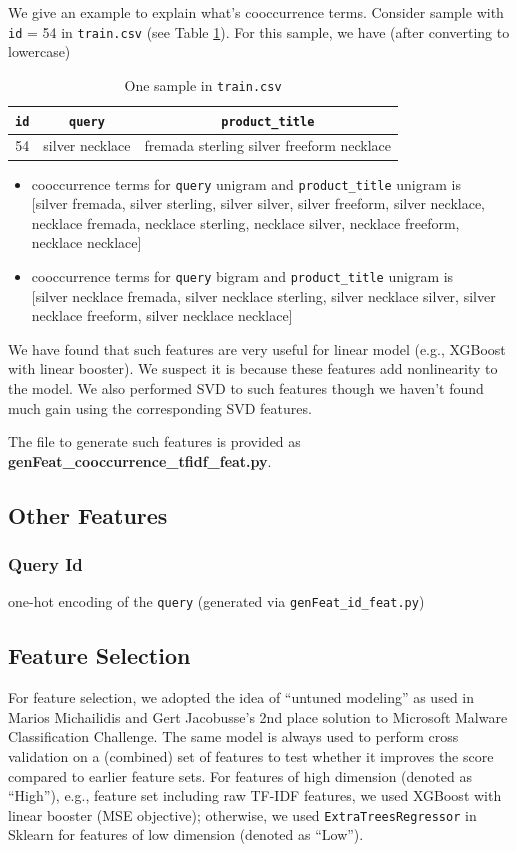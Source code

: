 \documentclass[12pt]{article}
\begin{document}
We give an example to explain what's cooccurrence terms. Consider sample with \texttt{id} = 54 in \texttt{train.csv} (see Table \ref{tab:sample_id54}). For this sample, we have (after converting to lowercase)
\begin{table}[!htb]
\centering
\caption{One sample in \texttt{train.csv}}
\label{tab:sample_id54}
\begin{tabular}{|c|c|c|}
\hline
\texttt{id} & \texttt{query} & \texttt{product\_title} \\
\hline
54 & silver necklace & fremada sterling silver freeform necklace\\
\hline
\end{tabular}
\end{table}
\begin{itemize}
\item cooccurrence terms for \texttt{query} unigram and \texttt{product\_title} unigram is\\
$[$silver fremada, silver sterling, silver silver, silver freeform, silver necklace, necklace fremada, necklace sterling, necklace silver, necklace freeform, necklace necklace$]$
\item cooccurrence terms for \texttt{query} bigram and \texttt{product\_title} unigram is\\
$[$silver necklace fremada, silver necklace sterling, silver necklace silver, silver necklace freeform, silver necklace necklace$]$
\end{itemize}
We have found that such features are very useful for linear model (e.g., XGBoost with linear booster). We suspect it is because these features add nonlinearity to the model. We also performed SVD to such features though we haven't found much gain using the corresponding SVD features.

The file to generate such features is provided as \textbf{genFeat\_cooccurrence\_tfidf\_feat.py}.


\subsection{Other Features}
\subsubsection{Query Id}
one-hot encoding of the \texttt{query} (generated via \texttt{genFeat\_id\_feat.py})

\subsection{Feature Selection}
For feature selection, we adopted the idea of ``untuned modeling'' as used in Marios Michailidis and Gert Jacobusse's 2nd place solution \cite{malware_2nd} to Microsoft Malware Classification Challenge. The same model is always used to perform cross validation on a (combined) set of features to test whether it improves the
score compared to earlier feature sets. For features of high dimension (denoted as ``High''), e.g., feature set including raw TF-IDF features, we used XGBoost with linear booster (MSE objective); otherwise, we used \texttt{ExtraTreesRegressor} in Sklearn for features of low dimension (denoted as ``Low'').
\end{document}
